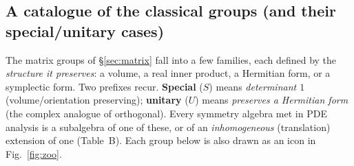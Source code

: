 \documentclass[11pt]{article}
\theoremstyle{definition}
\theoremstyle{remark}
\begin{document}
\subsection{A catalogue of the classical groups (and their special/unitary cases)}
\label{sec:catalogue}

The matrix groups of \S\ref{sec:matrix} fall into a few families, each defined by the \emph{structure it
preserves}: a volume, a real inner product, a Hermitian form, or a symplectic form. Two prefixes recur.
\textbf{Special} ($S$) means \emph{determinant $1$} (volume/orientation preserving); \textbf{unitary}
($U$) means \emph{preserves a Hermitian form} (the complex analogue of orthogonal). Every symmetry
algebra met in PDE analysis is a subalgebra of one of these, or of an \emph{inhomogeneous} (translation)
extension of one (Table~B). Each group below is also drawn as an icon in Fig.~\ref{fig:zoo}.
\end{document}
